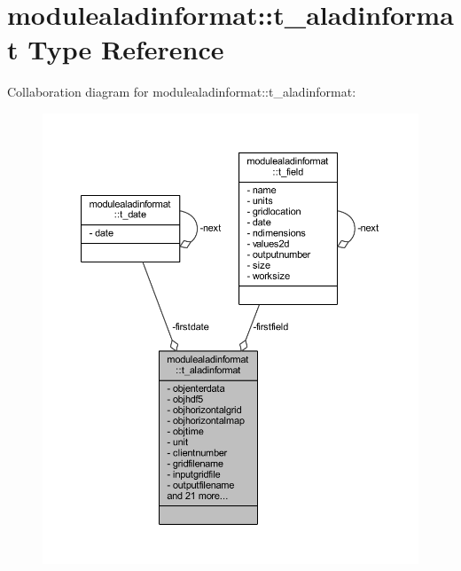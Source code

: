 \hypertarget{structmodulealadinformat_1_1t__aladinformat}{}\section{modulealadinformat\+:\+:t\+\_\+aladinformat Type Reference}
\label{structmodulealadinformat_1_1t__aladinformat}


Collaboration diagram for modulealadinformat\+:\+:t\+\_\+aladinformat\+:\nopagebreak
\begin{figure}[H]
\begin{center}
\leavevmode
\includegraphics[width=350pt]{structmodulealadinformat_1_1t__aladinformat__coll__graph}
\end{center}
\end{figure}
